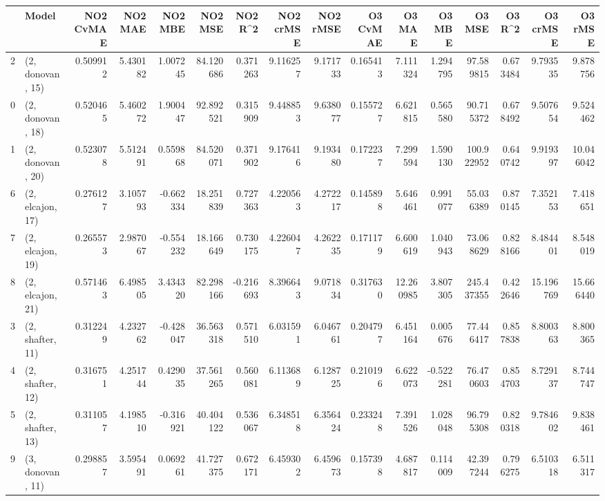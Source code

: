 \begin{tabular}{llrrrrrrrrrrrrrr}
\toprule
{} &             Model &  NO2 CvMAE &   NO2 MAE &   NO2 MBE &    NO2 MSE &   NO2 R\textasciicircum2 &  NO2 crMSE &  NO2 rMSE &  O3 CvMAE &     O3 MAE &    O3 MBE &      O3 MSE &    O3 R\textasciicircum2 &   O3 crMSE &    O3 rMSE \\
\midrule
2  &  (2, donovan, 15) &   0.509912 &  5.430182 &  1.007245 &  84.120686 &  0.371263 &   9.116257 &  9.171733 &  0.165413 &   7.111324 &  1.294795 &   97.589815 &  0.673484 &   9.793535 &   9.878756 \\
0  &  (2, donovan, 18) &   0.520465 &  5.460272 &  1.900447 &  92.892521 &  0.315909 &   9.448853 &  9.638077 &  0.155727 &   6.621815 &  0.565580 &   90.715372 &  0.678492 &   9.507654 &   9.524462 \\
1  &  (2, donovan, 20) &   0.523078 &  5.512491 &  0.559868 &  84.520071 &  0.371902 &   9.176416 &  9.193480 &  0.172237 &   7.299594 &  1.590130 &  100.922952 &  0.640742 &   9.919397 &  10.046042 \\
6  &  (2, elcajon, 17) &   0.276127 &  3.105793 & -0.662334 &  18.251839 &  0.727363 &   4.220563 &  4.272217 &  0.145898 &   5.646461 &  0.991077 &   55.036389 &  0.870145 &   7.352153 &   7.418651 \\
7  &  (2, elcajon, 19) &   0.265573 &  2.987067 & -0.554232 &  18.166649 &  0.730175 &   4.226047 &  4.262235 &  0.171179 &   6.600619 &  1.040943 &   73.068629 &  0.828166 &   8.484401 &   8.548019 \\
8  &  (2, elcajon, 21) &   0.571463 &  6.498505 &  3.434320 &  82.298166 & -0.216693 &   8.396643 &  9.071834 &  0.317630 &  12.260985 &  3.807305 &  245.437355 &  0.422646 &  15.196769 &  15.666440 \\
3  &  (2, shafter, 11) &   0.312249 &  4.232762 & -0.428047 &  36.563318 &  0.571510 &   6.031591 &  6.046761 &  0.204797 &   6.451164 &  0.005676 &   77.446417 &  0.857838 &   8.800363 &   8.800365 \\
4  &  (2, shafter, 12) &   0.316751 &  4.251744 &  0.429035 &  37.561265 &  0.560081 &   6.113689 &  6.128725 &  0.210196 &   6.622073 & -0.522281 &   76.470603 &  0.854703 &   8.729137 &   8.744747 \\
5  &  (2, shafter, 13) &   0.311057 &  4.198510 & -0.316921 &  40.404122 &  0.536067 &   6.348518 &  6.356424 &  0.233248 &   7.391526 &  1.028048 &   96.795308 &  0.820318 &   9.784602 &   9.838461 \\
9  &  (3, donovan, 11) &   0.298857 &  3.595491 &  0.069261 &  41.727375 &  0.672171 &   6.459302 &  6.459673 &  0.157398 &   4.687817 &  0.114009 &   42.397244 &  0.796275 &   6.510318 &   6.511317 \\

\end{tabular}
